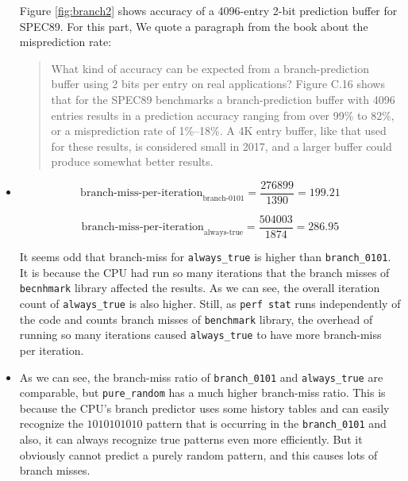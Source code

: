 \documentclass[12pt]{article}
\begin{document}
\begin{itemize}
Figure \ref{fig:branch2} shows accuracy of a 4096-entry 2-bit prediction buffer for SPEC89. For this part, We quote a paragraph from the book about the misprediction rate:

\begin{quote}
	What kind of accuracy can be expected from a branch-prediction buffer using 2
	bits per entry on real applications? Figure C.16 shows that for the SPEC89 benchmarks
	a branch-prediction buffer with 4096 entries results in a prediction accuracy ranging from over 99\% to 82\%, or a misprediction rate of 1\%–18\%. A 4K entry
	buffer, like that used for these results, is considered small in 2017, and a larger
	buffer could produce somewhat better results.
\end{quote}

\item 

$$\text{branch-miss-per-iteration}_\text{branch-0101}=\frac{276899}{1390}=199.21$$

$$\text{branch-miss-per-iteration}_\text{always-true}=\frac{504003}{1874}=286.95$$

It seems odd that branch-miss for \Verb+always_true+ is higher than \Verb+branch_0101+. It is because the CPU had run so many iterations that the branch misses of \Verb+becnhmark+ library affected the results. As we can see, the overall iteration count of \Verb+always_true+ is also higher. Still, as \Verb+perf stat+ runs independently of the code and counts branch misses of \Verb+benchmark+ library, the overhead of running so many iterations caused \Verb+always_true+ to have more branch-miss per iteration.

\item 
As we can see, the branch-miss ratio of \Verb+branch_0101+ and \Verb+always_true+ are comparable, but \Verb+pure_random+ has a much higher branch-miss ratio. This is because the CPU's branch predictor uses some history tables and can easily recognize the $1010101010$ pattern that is occurring in the \Verb+branch_0101+ and also, it can always recognize true patterns even more efficiently. But it obviously cannot predict a purely random pattern, and this causes lots of branch misses.

	\end{itemize}
	
	
	
	
\end{document}
